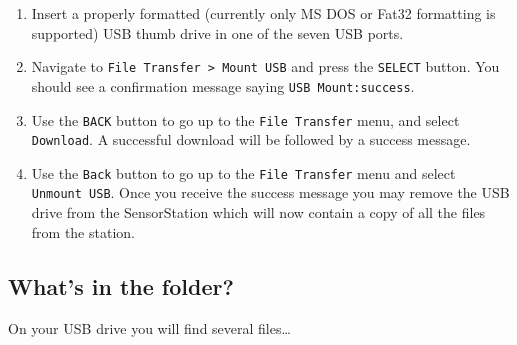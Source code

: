 \documentclass[
]{article}
\providecommand{\tightlist}{%
  \setlength{\itemsep}{0pt}\setlength{\parskip}{0pt}}
\begin{document}
\begin{enumerate}
\def\labelenumi{\arabic{enumi}.}
\tightlist
\item
  Insert a properly formatted (currently only MS DOS or Fat32 formatting
  is supported) USB thumb drive in one of the seven USB ports.
\item
  Navigate to \texttt{File\ Transfer\ \textgreater{}\ Mount\ USB} and
  press the \texttt{SELECT} button. You should see a confirmation
  message saying \texttt{USB\ Mount:success}.
\item
  Use the \texttt{BACK} button to go up to the \texttt{File\ Transfer}
  menu, and select \texttt{Download}. A successful download will be
  followed by a success message.
\item
  Use the \texttt{Back} button to go up to the \texttt{File\ Transfer}
  menu and select \texttt{Unmount\ USB}. Once you receive the success
  message you may remove the USB drive from the SensorStation which will
  now contain a copy of all the files from the station.
\end{enumerate}

\hypertarget{whats-in-the-folder}{%
\subsection{What's in the folder?}\label{whats-in-the-folder}}

On your USB drive you will find several files\ldots{}
\end{document}
